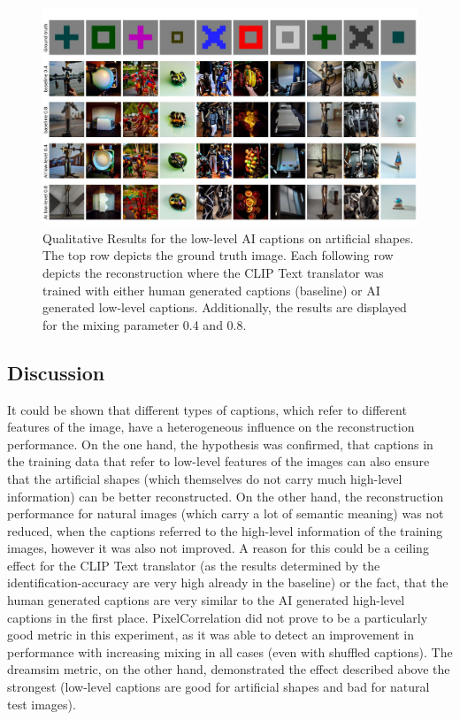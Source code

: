 \begin{figure}[ht]
    \centering
    \includegraphics[width=1\textwidth]{plots/aicap_qual_art.JPEG}
    \caption[Experiment 2: Reconstructed images for artificial shapes]{Qualitative Results for the low-level AI captions on artificial shapes. The top row depicts the ground truth image. Each following row depicts the reconstruction where the CLIP Text translator was trained with either human generated captions (baseline) or AI generated low-level captions. Additionally, the results are displayed for the mixing parameter 0.4 and 0.8.}\label{fig:aicap_qual_art}
\end{figure}

\subsection{Discussion}


It could be shown that different types of captions, which refer to different features of the image, have a heterogeneous influence on the reconstruction performance. On the one hand, the hypothesis was confirmed, that captions in the training data that refer to low-level features of the images can also ensure that the artificial shapes (which themselves do not carry much high-level information) can be better reconstructed. On the other hand, the reconstruction performance for natural images (which carry a lot of semantic meaning) was not reduced,  when the captions referred to the high-level information of the training images, however it was also not improved. A reason for this could be a ceiling effect for the CLIP Text translator (as the results determined by the identification-accuracy are very high already in the baseline) or the fact, that the human generated captions are very similar to the AI generated high-level captions in the first place. PixelCorrelation did not prove to be a particularly good metric in this experiment, as it was able to detect an improvement in performance with increasing mixing in all cases (even with shuffled captions). The dreamsim metric, on the other hand,  demonstrated the effect described above the strongest (low-level captions are good for artificial shapes and bad for natural test images). 

